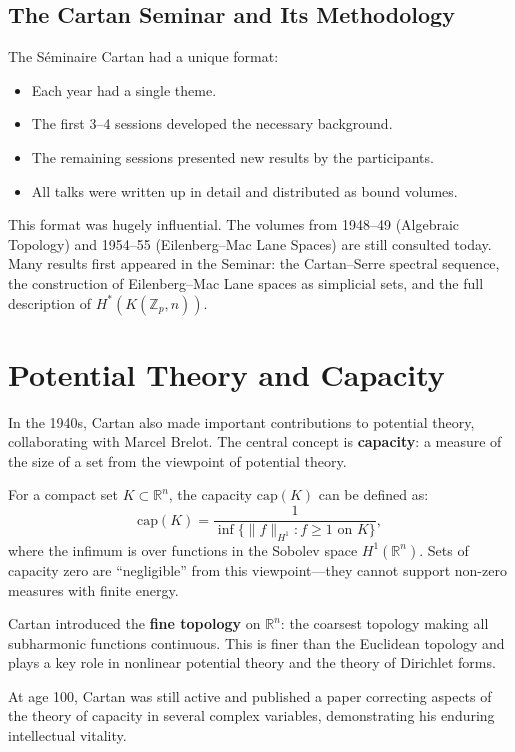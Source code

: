 \subsection{The Cartan Seminar and Its Methodology}

The S{\'e}minaire Cartan had a unique format:
\begin{itemize}
    \item Each year had a single theme.
    \item The first 3--4 sessions developed the necessary background.
    \item The remaining sessions presented new results by the participants.
    \item All talks were written up in detail and distributed as bound volumes.
\end{itemize}

This format was hugely influential. The volumes from 1948--49 (Algebraic Topology) and 1954--55 (Eilenberg--Mac Lane Spaces) are still consulted today. Many results first appeared in the Seminar: the Cartan--Serre spectral sequence, the construction of Eilenberg--Mac Lane spaces as simplicial sets, and the full description of $H^*(K(\mathbb{Z}_p, n))$.

\section*{Potential Theory and Capacity}

In the 1940s, Cartan also made important contributions to potential theory, collaborating with Marcel Brelot. The central concept is \textbf{capacity}: a measure of the size of a set from the viewpoint of potential theory.

For a compact set $K \subset \mathbb{R}^n$, the capacity $\text{cap}(K)$ can be defined as:
\[
\text{cap}(K) = \frac{1}{\inf\{\|f\|_{H^1} : f \geq 1 \text{ on } K\}},
\]
where the infimum is over functions in the Sobolev space $H^1(\mathbb{R}^n)$. Sets of capacity zero are ``negligible'' from this viewpoint---they cannot support non-zero measures with finite energy.

Cartan introduced the \textbf{fine topology} on $\mathbb{R}^n$: the coarsest topology making all subharmonic functions continuous. This is finer than the Euclidean topology and plays a key role in nonlinear potential theory and the theory of Dirichlet forms.

At age 100, Cartan was still active and published a paper correcting aspects of the theory of capacity in several complex variables, demonstrating his enduring intellectual vitality.


